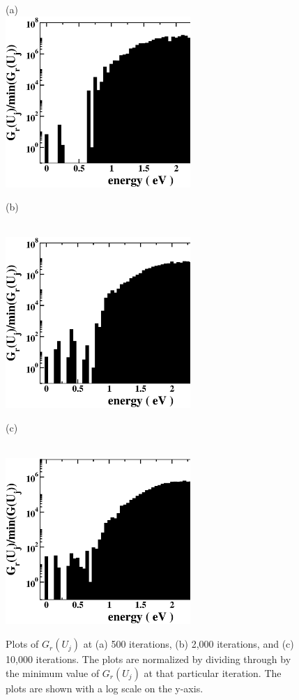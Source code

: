 \documentclass[aps,pre,reprint,superscriptaddress,showkeys]{revtex4-2}
\begin{document}
\begin{figure}[h!]
(a)\\
\vspace{1cm}
\includegraphics[width=7cm]{fig7a.eps}
\vspace{1cm}
\centerline{(b)}\\
\vspace{0.15cm}
\includegraphics[width=7cm]{fig7b.eps}
\vspace{1cm}
\centerline{(c)}\\
\vspace{0.15cm}
\includegraphics[width=7cm]{fig7c.eps}
\caption{Plots of $G_r(U_j)$ at (a) 500 iterations, (b) 2,000 iterations, and (c) 10,000 iterations. The plots are normalized by dividing through by the minimum value of $G_r(U_j)$ at that particular iteration. The plots are shown with a log scale on the y-axis.  \label{converge_GE}}
\end{figure}
\end{document}
